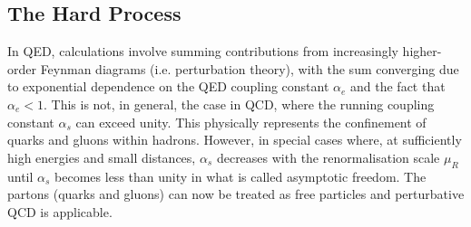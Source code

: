 \subsection{The Hard Process}
In QED, calculations involve summing contributions from increasingly higher-order Feynman diagrams (i.e. perturbation theory), with the sum converging due to exponential dependence on the QED coupling constant $\alpha_{e}$  and the fact that $\alpha_{e} < 1$. This is not, in general, the case in QCD, where the running coupling constant $\alpha_{s}$ can exceed unity. This physically represents the confinement of quarks and gluons within hadrons. However, in special cases where, at sufficiently high energies and small distances, $\alpha_{s}$ decreases with the renormalisation scale $\mu_{R}$ until $\alpha_{s}$ becomes less than unity in what is called asymptotic freedom. The partons (quarks and gluons) can now be treated as free particles and perturbative QCD is applicable.

